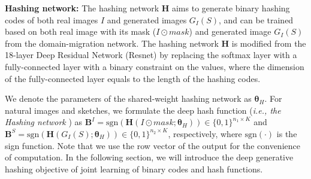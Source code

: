 \documentclass[runningheads]{llncs}
\newcommand{\sgn}{{\mathrm{sgn}}}
\begin{document}
\noindent\textbf{Hashing network:} The hashing network $\mathbf{H}$ aims to generate binary hashing codes of both real images $I$ and generated images $G_I\left(S\right)$, and can be trained based on both real image  with its mask ($I \odot mask$) and generated image $G_I\left(S\right)$ from the domain-migration network. The hashing network $\mathbf{H}$ is modified from the 18-layer Deep Residual Network (Resnet) \cite{HeZRS16} by replacing the softmax layer with a fully-connected layer with a binary constraint on the values, where the dimension of the fully-connected layer equals to the length of the hashing codes. 



We denote the parameters of the shared-weight hashing network as $\bm{\theta}_H$. For natural images and sketches, we formulate the deep hash function (\emph{i.e., the Hashing network} ) as $\mathbf{B}^I = \sgn ( \mathbf{H} ( I \odot mask;\bm{\theta}_H)) \in \{0, 1\}^{n_1 \times K}$ and $\mathbf{B}^S =\sgn ( \mathbf{H} ( G_I ( S);\bm{\theta}_H)) \in \{0, 1\}^{n_2 \times K}$, respectively,
where $\sgn(\cdot)$ is the sign function. Note that we use the row vector of the output for the convenience of computation. In the following section, we will introduce the deep generative hashing objective of joint learning of binary codes and hash functions.
\end{document}
